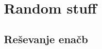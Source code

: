 \documentclass[10pt,a4paper,oneside]{book}
\begin{document}

%

\chapter{Random stuff}
\section{Reševanje enačb}

\end{document}
